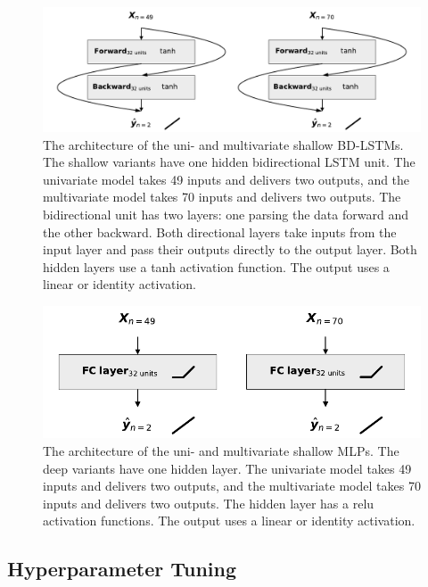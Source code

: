 \documentclass[mstat,12pt]{unswthesis}
\begin{document}
\begin{figure}[H]
\centerline{\includegraphics[width=\columnwidth]{Figures/Diagrams/BD-LSTM Shallow.pdf}}
\caption{The architecture of the uni- and multivariate shallow BD-LSTMs. The shallow variants have one hidden bidirectional LSTM unit. The univariate model takes 49 inputs and delivers two outputs, and the multivariate model takes 70 inputs and delivers two outputs. The bidirectional unit has two layers: one parsing the data forward and the other backward. Both directional layers take inputs from the input layer and pass their outputs directly to the output layer. Both hidden layers use a tanh activation function. The output uses a linear or identity activation.}
\label{lstm_shallow}
\end{figure}

\begin{figure}[H]
\centerline{\includegraphics[width=.7\columnwidth]{Figures/Diagrams/MLP Shallow.pdf}}
\caption{The architecture of the uni- and multivariate shallow MLPs. The deep variants have one hidden layer. The univariate model takes 49 inputs and delivers two outputs, and the multivariate model takes 70 inputs and delivers two outputs. The hidden layer has a relu activation functions. The output uses a linear or identity activation.}
\label{mlp_shallow}
\end{figure}

\hypertarget{hyperparam-tuning}{%
\subsection{Hyperparameter Tuning}\label{hyperparam-tuning}}
\end{document}
